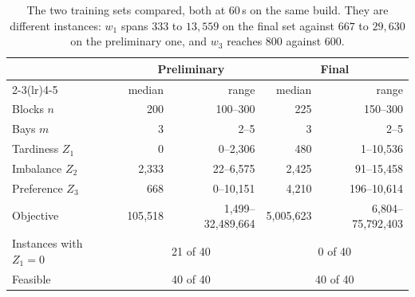 \documentclass[runningheads]{llncs}
\begin{document}
\begin{table}[t]
\centering
\caption{The two training sets compared, both at $60$\,s on the same build. They are different
instances: $w_1$ spans $333$ to $13{,}559$ on the final set against $667$ to $29{,}630$ on the
preliminary one, and $w_3$ reaches $800$ against $600$.}
\label{tab:final}
\footnotesize
\begin{tabular}{lrrrr}
\toprule
 & \multicolumn{2}{c}{Preliminary} & \multicolumn{2}{c}{Final} \\
\cmidrule(lr){2-3}\cmidrule(lr){4-5}
 & median & range & median & range \\
\midrule
Blocks $n$ & 200 & 100--300 & 225 & 150--300 \\
Bays $m$ & 3 & 2--5 & 3 & 2--5 \\
Tardiness $Z_1$ & 0 & 0--2{,}306 & 480 & 1--10{,}536 \\
Imbalance $Z_2$ & 2{,}333 & 22--6{,}575 & 2{,}425 & 91--15{,}458 \\
Preference $Z_3$ & 668 & 0--10{,}151 & 4{,}210 & 196--10{,}614 \\
Objective & 105{,}518 & 1{,}499--32{,}489{,}664 & 5{,}005{,}623 & 6{,}804--75{,}792{,}403 \\
\midrule
Instances with $Z_1=0$ & \multicolumn{2}{c}{21 of 40} & \multicolumn{2}{c}{0 of 40} \\
Feasible & \multicolumn{2}{c}{40 of 40} & \multicolumn{2}{c}{40 of 40} \\
\bottomrule
\end{tabular}
\end{table}
\end{document}
